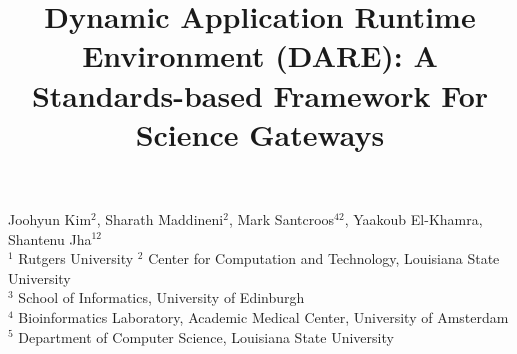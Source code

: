 \documentclass[]{article}
\begin{document}
\title{Dynamic Application Runtime Environment (DARE): A
  Standards-based Framework For Science Gateways}

\begin{center}
  Joohyun Kim$^{2}$, Sharath Maddineni$^{2}$, Mark Santcroos$^{42}$,
  Yaakoub El-Khamra, Shantenu Jha$^{12}$\\
  $^1$ Rutgers University
  $^2$ Center for Computation and Technology, Louisiana State University\\
  $^3$ School of Informatics, University of Edinburgh\\
  $^4$ Bioinformatics Laboratory, Academic Medical Center, University
  of Amsterdam\\
  $^5$ Department of Computer Science, Louisiana State University\\
\end{center}


\end{document}
